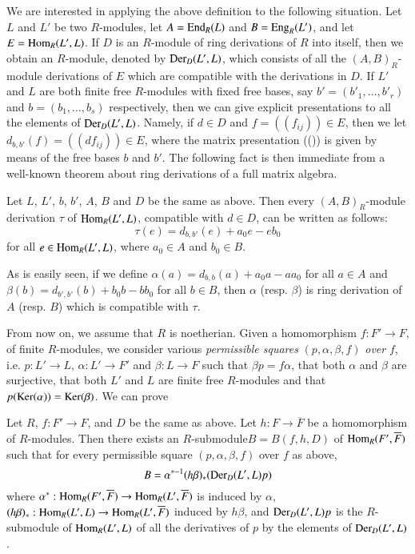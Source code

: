 We are interested in applying the above definition to the following situation. Let $L$ and $L'$ be two $R$-modules, let $A=\operatorname{\mathrm{End}}_{R}(L)$ and $B=\operatorname{\mathrm{Eng}}_{R}(L')$, and let $E=\operatorname{\mathrm{Hom}}_{R}(L',L)$. If $D$ is an $R$-module of ring derivations of $R$ into itself, then we obtain an $R$-module, denoted by $\operatorname{\mathrm{Der}}_{D}(L',L)$, which consists of all the $(A,B)_{R}$-module derivations of $E$ which are compatible with the derivations in $D$. If $L'$ and $L$ are both finite free $R$-modules with fixed free bases, say $b'=(b'_{1},\ldots,b'_{r})$ and $b=(b_{1},\ldots,b_{s})$ respectively, then we can give explicit presentations to all the elements of $\operatorname{\mathrm{Der}}_{D}(L',L)$. Namely, if $d\in D$ and $f=((f_{ij}))\in E$, then we let $d_{b,b'}(f)=((df_{ij}))\in E$, where the matrix presentation ((\quad)) is given by means of the free bases $b$ and $b'$. The following fact is then immediate from a well-known theorem about ring derivations of a full matrix algebra.

\begin{theorem}\label{art10-sec1-thm1.3}
Let $L$, $L'$, $b$, $b'$, $A$, $B$ and $D$ be the same as above. Then every $(A,B)_{R}$-module derivation $\tau$ of $\operatorname{\mathrm{Hom}}_{R}(L',L)$, compatible with $d\in D$, can be written as follows:
$$
\tau(e)=d_{b,b'}(e)+a_{0}e-eb_{0}
$$
for all $e\in \operatorname{\mathrm{Hom}}_{R}(L',L)$, where $a_{0}\in A$ and $b_{0}\in B$.
\end{theorem}

As is easily seen, if we define $\alpha(a)=d_{b,b}(a)+a_{0}a-aa_{0}$ for all $a\in A$ and $\beta(b)=d_{b',b'}(b)+b_{0}b-bb_{0}$ for all $b\in B$, then $\alpha$ (resp. $\beta$) is ring derivation of $A$ (resp. $B$) which is compatible with $\tau$.

From now on, we assume that $R$ is noetherian. Given a homomorphism $f:F'\to F$, of finite $R$-modules, we consider various {\em permissible squares} $(p,\alpha,\beta,f)$ {\em over} $f$, i.e. $p:L'\to L$, $\alpha:L'\to F'$ and $\beta:L\to F$ such that $\beta p=f\alpha$, that both $\alpha$ and $\beta$ are surjective, that both $L'$ and $L$ are finite free $R$-modules and that $p(\operatorname{\mathrm{Ker}}(\alpha))=\operatorname{\mathrm{Ker}}(\beta)$. We can prove

\begin{theorem}\label{art10-sec1-thm1.4}
Let $R$, $f:F'\to F$, and $D$ be the same as above. Let $h:F\to \overline{F}$ be a homomorphism of $R$-modules. Then there exists an $R$-submodule\pageoriginale $B=B(f,h,D)$ of $\operatorname{\mathrm{Hom}}_{R}(F',\overline{F})$ such that for every permissible square $(p,\alpha,\beta,f)$ over $f$ as above,
$$
B=\alpha^{*-1}(h\beta)_{*}(\operatorname{\mathrm{Der}}_{D}(L',L)p)
$$
where $\alpha^{*}:\operatorname{\mathrm{Hom}}_{R}(F',\overline{F})\to \operatorname{\mathrm{Hom}}_{R}(L',\overline{F})$ is induced by $\alpha$, $(h\beta)_{*}:\operatorname{\mathrm{Hom}}_{R}(L',L)\to \operatorname{\mathrm{Hom}}_{R}(L',\overline{F})$ induced by $h\beta$, and $\operatorname{\mathrm{Der}}_{D}(L',L)p$ is the $R$-submodule of $\operatorname{\mathrm{Hom}}_{R}(L',L)$ of all the derivatives of $p$ by the elements of $\operatorname{\mathrm{Der}}_{D}(L',L)$.
\end{theorem}


